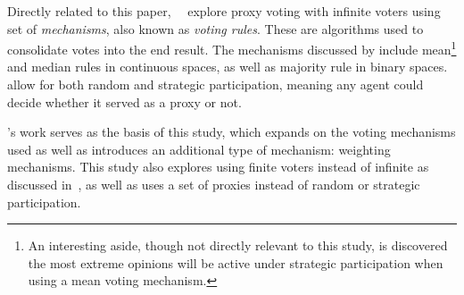 Directly related to this paper,\ ~\cite{Cohensius2017} explore
proxy voting with infinite voters using set of \textit{mechanisms}, also
known as \textit{voting rules}.
These are algorithms used to consolidate votes into the end result.
The mechanisms discussed by  include mean\footnote{An
interesting aside, though not directly relevant to this
study, is  discovered the most extreme opinions will be
active under strategic participation when using a mean voting
mechanism\cite[lemma~9]{Cohensius2017}.}
and median rules in continuous spaces, as well as majority rule in
binary spaces.
 allow for both random and strategic participation, meaning any
agent could decide whether it served as a proxy or not.

's work serves as the basis of this study, which expands on
the voting mechanisms used as well as introduces an additional type of
mechanism: weighting mechanisms.
This study also explores using finite voters instead of infinite as discussed
in~\cite{Cohensius2017}, as well as uses a set of proxies instead of random or
strategic participation.
